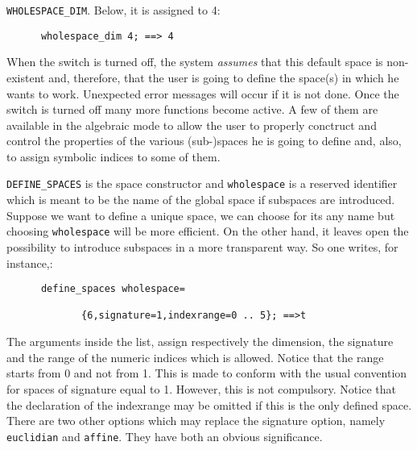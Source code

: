 \texttt{WHOLESPACE\_DIM}. Below, it is assigned to 4: 
\begin{verbatim}
      wholespace_dim 4; ==> 4
\end{verbatim}
When the switch  is turned off, the system \emph{assumes} that this default
space is non-existent and, therefore, that the user is going to define the 
space(s) in which he wants to work.
Unexpected error messages will occur if it is not done.
Once the switch is turned off many more functions become active. A few of them are 
available in the algebraic mode to allow the user to properly conctruct 
and control the properties of the various (sub-)spaces he is going to define
and, also, to assign symbolic indices to some of them.

\texttt{DEFINE\_SPACES} is the space constructor and 
\texttt{wholespace}
is a reserved identifier which is meant to be the name of the global space 
if subspaces are introduced.   
Suppose we want to define a unique space, we can choose for its any name but 
choosing \texttt{wholespace} will be more efficient. On the other hand, it leaves 
open the possibility to introduce subspaces in a more transparent way.
So one writes, for instance,:
\begin{verbatim}
      define_spaces wholespace=
        
             {6,signature=1,indexrange=0 .. 5}; ==>t
\end{verbatim} 
The arguments inside the list, assign respectively the dimension, the signature
and the range of the numeric indices which is allowed. 
Notice that the range starts from 0 and not from 1. This is made to conform with 
the usual convention for spaces of signature equal to 1. However, this is not 
compulsory.
Notice that the declaration of the indexrange may be omitted if this is the 
only  defined space.  
There are two other options which may replace the signature option, namely
\texttt{euclidian} and \texttt{affine}. They 
have both an obvious significance. 

